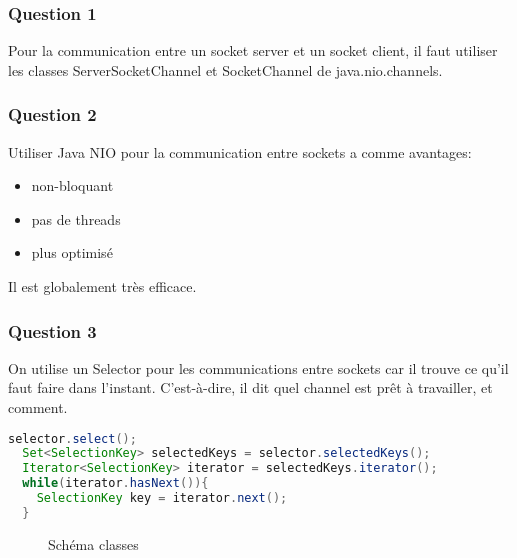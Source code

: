 \subsubsection{Question 1}

Pour la communication entre un socket server et un socket client, il faut utiliser les classes ServerSocketChannel et SocketChannel de java.nio.channels.

\subsubsection{Question 2}

Utiliser Java NIO pour la communication entre sockets a comme avantages:
\begin{itemize}
  \item non-bloquant
  \item pas de threads
  \item plus optimisé
\end{itemize}

Il est globalement très efficace.

\subsubsection{Question 3}

On utilise un Selector pour les communications entre sockets car il trouve ce qu'il faut faire dans l'instant.
C'est-à-dire, il dit quel channel est prêt à travailler, et comment.

\begin{lstlisting}[language=Java,caption={Exemple selector},captionpos=b]
  selector.select();
  Set<SelectionKey> selectedKeys = selector.selectedKeys();
  Iterator<SelectionKey> iterator = selectedKeys.iterator();
  while(iterator.hasNext()){
    SelectionKey key = iterator.next();
  }
\end{lstlisting}

\begin{figure}[h!]
  \centering
  \caption{Schéma classes}
\end{figure}

